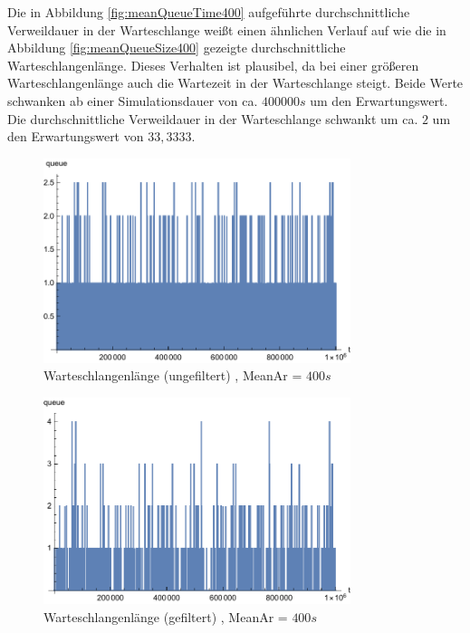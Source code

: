 Die in Abbildung \ref{fig:meanQueueTime400} aufgeführte durchschnittliche Verweildauer in der Warteschlange weißt einen ähnlichen Verlauf auf wie die in Abbildung \ref{fig:meanQueueSize400} gezeigte durchschnittliche Warteschlangenlänge. Dieses Verhalten ist plausibel, da bei einer größeren Warteschlangenlänge auch die Wartezeit in der Warteschlange steigt. Beide Werte schwanken ab einer Simulationsdauer von ca. $400000s$ um den Erwartungswert. Die durchschnittliche Verweildauer in der Warteschlange schwankt um ca. $2$ um den Erwartungswert von $33,3333$. 

\begin{figure}[htpb]
	\centering
	\includegraphics[width=0.8\textwidth]{abbildungen/1_Phone/Arrival_400_Serve_100_dur_1000000_Skip_0/QueueStepPlotAll.pdf}
	\caption{Warteschlangenlänge (ungefiltert) , MeanAr = $400s$}
	\label{fig:QueueStepPlotAll400}
\end{figure} 
\begin{figure}[htpb]
	\centering
	\includegraphics[width=0.8\textwidth]{abbildungen/1_Phone/Arrival_400_Serve_100_dur_1000000_Skip_0/QueueStepPlotAllFiltered.pdf}
	\caption{Warteschlangenlänge (gefiltert) , MeanAr = $400s$}
	\label{fig:QueueStepPlotAllFiltered400}
\end{figure}

